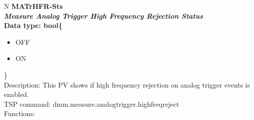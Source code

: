 \documentclass[openany]{article}
\begin{document}
		\begin{tabular}{N}
			\hline
			\bfseries MATrHFR-Sts\label{pv:matrhfr-sts} \\ \hline
			\emph{Measure Analog Trigger High Frequency Rejection Status} \\
			Data type: bool\{\begin{itemize}[noitemsep]
				\small
				\item[] OFF
				\item[] ON
			\end{itemize}\} \\
			Description: This PV shows if high frequency rejection on analog trigger events is enabled. \\
			TSP command: dmm.measure.analogtrigger.highfreqreject \\
			Functions: \\
			\arrayrulecolor{\FuncTableBorderColor}

		\end{tabular}
\end{document}
